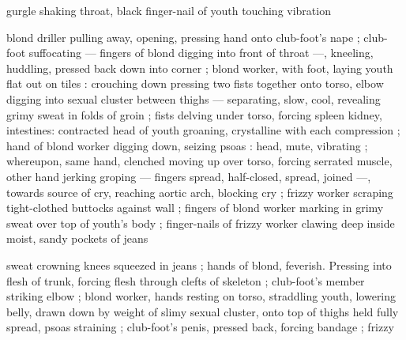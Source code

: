 gurgle shaking throat, black finger-nail of youth touching vibration

blond driller pulling away, opening, pressing hand onto club-foot's
nape ; club-foot suffocating — fingers of blond digging into front of
throat —, kneeling, huddling, pressed back down into corner ; blond
worker, with foot, laying youth flat out on tiles : crouching down
pressing two fists together onto torso, elbow digging into sexual
cluster between thighs — separating, slow, cool, revealing grimy
sweat in folds of groin ; fists delving under torso, forcing spleen
kidney, intestines: contracted head of youth groaning, crystalline
with each compression ; hand of blond worker digging down, seizing
psoas : head, mute, vibrating ; whereupon, same hand, clenched
moving up over torso, forcing serrated muscle, other hand jerking
groping — fingers spread, half-closed, spread, joined —, towards
source of cry, reaching aortic arch, blocking cry ; frizzy worker
scraping tight-clothed buttocks against wall ; fingers of blond worker
marking in grimy sweat over top of youth's body ; finger-nails of
frizzy worker clawing deep inside moist, sandy pockets of jeans

sweat crowning knees squeezed in jeans ; hands of blond, feverish.
Pressing into flesh of trunk, forcing flesh through clefts of skeleton
; club-foot's member striking elbow ; blond worker, hands resting on
torso, straddling youth, lowering belly, drawn down by weight of
slimy sexual cluster, onto top of thighs held fully spread, psoas
straining ; club-foot's penis, pressed back, forcing bandage ; frizzy

